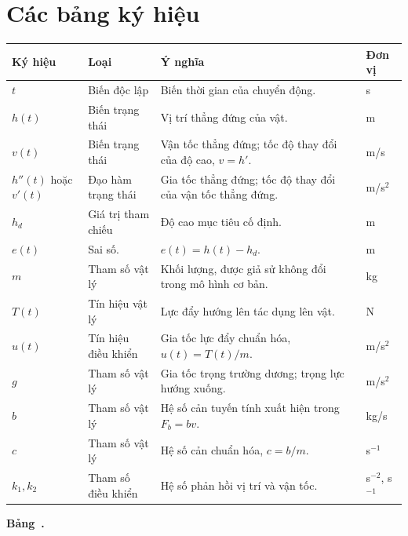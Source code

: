﻿\documentclass[12pt]{article}
\begin{document}
\section{Các bảng ký hiệu}

\begin{center}
\label{tab:1d-notation}
\centering
\renewcommand{\arraystretch}{1.2}
\setlength{\tabcolsep}{3pt}
\begin{tabular}{|>{\centering\arraybackslash}m{1.55cm}
                |>{\raggedright\arraybackslash}m{2.45cm}
                |>{\raggedright\arraybackslash}m{6.2cm}
                |>{\centering\arraybackslash}m{2.2cm}|}
\hline
\textbf{Ký hiệu} & \textbf{Loại} & \textbf{Ý nghĩa} & \textbf{Đơn vị} \\
\hline
$t$ & Biến độc lập & Biến thời gian của chuyển động. & s \\
\hline
$h(t)$ & Biến trạng thái & Vị trí thẳng đứng của vật. & m \\
\hline
$v(t)$ & Biến trạng thái & Vận tốc thẳng đứng; tốc độ thay đổi của độ cao, $v = h'$. & m/s \\
\hline
$h''(t)$ hoặc $v'(t)$ & Đạo hàm trạng thái & Gia tốc thẳng đứng; tốc độ thay đổi của vận tốc thẳng đứng. & m/s$^2$ \\
\hline
$h_d$ & Giá trị tham chiếu & Độ cao mục tiêu cố định. & m \\
\hline
$e(t)$ & Sai số. &$e(t) = h(t) - h_d$. & m \\
\hline
$m$ & Tham số vật lý & Khối lượng, được giả sử không đổi trong mô hình cơ bản. & kg \\
\hline
$T(t)$ & Tín hiệu vật lý & Lực đẩy hướng lên tác dụng lên vật. & N \\
\hline
$u(t)$ & Tín hiệu điều khiển & Gia tốc lực đẩy chuẩn hóa, $u(t) = T(t)/m$. & m/s$^2$ \\
\hline
$g$ & Tham số vật lý & Gia tốc trọng trường dương; trọng lực hướng xuống. & m/s$^2$ \\
\hline
$b$ & Tham số vật lý & Hệ số cản tuyến tính xuất hiện trong $F_b = bv$. & kg/s \\
\hline
$c$ & Tham số vật lý & Hệ số cản chuẩn hóa, $c = b/m$. & s$^{-1}$ \\
\hline
$k_1, k_2$ & Tham số điều khiển & Hệ số phản hồi vị trí và vận tốc. & s$^{-2}$, s$^{-1}$ \\
\hline
\end{tabular}
\par\smallskip
\textbf{Bảng~\thetable.} 
\end{center}
\end{document}
